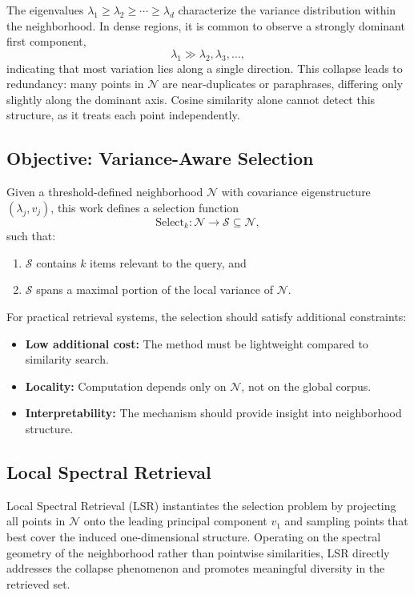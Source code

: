 \documentclass{article}
\begin{document}
The eigenvalues $\lambda_1 \ge \lambda_2 \ge \cdots \ge \lambda_d$ characterize the variance distribution within the neighborhood. In dense regions, it is common to observe a strongly dominant first component,
\begin{equation}
    \lambda_1 \gg \lambda_2, \lambda_3, \ldots,
\end{equation}
indicating that most variation lies along a single direction. This collapse leads to redundancy: many points in $\mathcal{N}$ are near-duplicates or paraphrases, differing only slightly along the dominant axis. Cosine similarity alone cannot detect this structure, as it treats each point independently.

\subsection{Objective: Variance-Aware Selection}
Given a threshold-defined neighborhood $\mathcal{N}$ with covariance eigenstructure $(\lambda_j, v_j)$, this work defines a selection function
\begin{equation}
    \text{Select}_k : \mathcal{N} \rightarrow \mathcal{S} \subseteq \mathcal{N},
\end{equation}
such that:
\begin{enumerate}
    \item $\mathcal{S}$ contains $k$ items relevant to the query, and
    \item $\mathcal{S}$ spans a maximal portion of the local variance of $\mathcal{N}$.
\end{enumerate}

For practical retrieval systems, the selection should satisfy additional constraints:
\begin{itemize}
    \item \textbf{Low additional cost:} The method must be lightweight compared to similarity search.
    \item \textbf{Locality:} Computation depends only on $\mathcal{N}$, not on the global corpus.
    \item \textbf{Interpretability:} The mechanism should provide insight into neighborhood structure.
\end{itemize}

\subsection{Local Spectral Retrieval}
Local Spectral Retrieval (LSR) instantiates the selection problem by projecting all points in $\mathcal{N}$ onto the leading principal component $v_1$ and sampling points that best cover the induced one-dimensional structure. Operating on the spectral geometry of the neighborhood rather than pointwise similarities, LSR directly addresses the collapse phenomenon and promotes meaningful diversity in the retrieved set.
\end{document}
